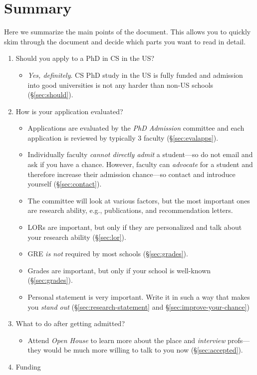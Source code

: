 \documentclass[11pt]{article}
\begin{document}
\tableofcontents


\section{Summary}\label{sec:summary}
Here we summarize the main points of the document. This allows you to quickly skim through the document and decide which parts you want to read in detail.
\begin{enumerate}
\item Should you apply to a PhD in CS in the US?
\begin{itemize}
    \item \emph{Yes, definitely}.  CS PhD study in the US is fully funded and admission into good universities is not any harder than non-US schools (\S\ref{sec:should}).
\end{itemize}
\item How is your application evaluated?
\begin{itemize}
    \item Applications are evaluated by the \emph{PhD Admission} committee and each application is reviewed by typically 3 faculty (\S\ref{sec:evalapps}).
    \item Individually faculty \emph{cannot directly admit} a student---so do not email and ask if you have a chance. However, faculty can \emph{advocate} for a student and therefore increase their admission chance---so contact and introduce yourself (\S\ref{sec:contact}).
    \item The committee will look at various factors, but the most important ones are research ability, e.g., publications, and recommendation letters.
    \item LORs are important, but only if they are personalized and talk about your research ability (\S\ref{sec:lor}).
    \item GRE \emph{is not} required by most schools (\S\ref{sec:grades}).
    \item Grades are important, but only if your school is well-known (\S\ref{sec:grades}).
    \item Personal statement is very important. Write it in such a way that makes you \emph{stand out} (\S\ref{sec:research-statement} and \S\ref{sec:improve-your-chance})
\end{itemize}
\item What to do after getting admitted?
\begin{itemize}
    \item Attend \emph{Open House} to learn more about the place and \emph{interview} profs---they would be much more willing to talk to you now (\S\ref{sec:accepted}).
\end{itemize}
\item Funding
\end{enumerate}
\end{document}

